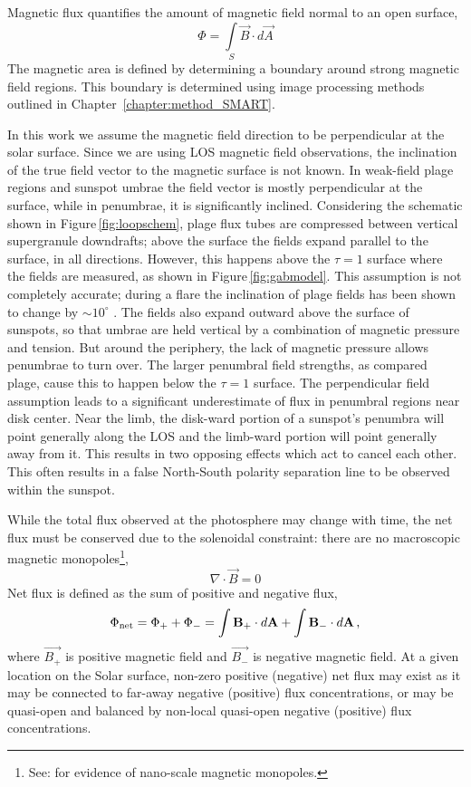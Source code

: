 Magnetic flux quantifies the amount of magnetic field normal to an open surface,
\begin{equation}
\Phi = \int\limits_S \vec{B} \cdot d\vec{A}  
\end{equation}
The magnetic area is defined by determining a boundary around strong magnetic field regions. This boundary is determined using image processing methods outlined in Chapter~\ref{chapter:method_SMART}.

In this work we assume the magnetic field direction to be perpendicular at the solar surface. Since we are using \gls{LOS} magnetic field observations, the inclination of the true field vector to the magnetic surface is not known. In weak-field plage regions and sunspot umbrae the field vector is mostly perpendicular at the surface, while in penumbrae, it is significantly inclined. Considering the schematic shown in Figure\,\ref{fig:loopschem}, plage flux tubes are compressed between vertical supergranule downdrafts; above the surface the fields expand parallel to the surface, in all directions. However, this happens above the $\tau=1$ surface where the fields are measured, as shown in Figure\,\ref{fig:gabmodel}. This assumption is not completely accurate; during a flare the inclination of plage fields has been shown to change by $\sim$$10^{\circ}$ \citep{Murray:2012}. The fields also expand outward above the surface of sunspots, so that umbrae are held vertical by a combination of magnetic pressure and tension. But around the periphery, the lack of magnetic pressure allows penumbrae to turn over. The larger penumbral field strengths, as compared plage, cause this to happen below the $\tau=1$ surface. The perpendicular field assumption leads to a significant underestimate of flux in penumbral regions near disk center. Near the limb,  the disk-ward portion of a sunspot's penumbra will point generally along the LOS and the limb-ward portion will point generally away from it. This results in two opposing effects which act to cancel each other. This often results in a false North-South polarity separation line to be observed within the sunspot.

While the total flux observed at the photosphere may change with time, the net flux must be conserved due to the solenoidal constraint: there are no macroscopic magnetic monopoles\footnote{See: \citet{Mengotti:2010} for evidence of nano-scale magnetic monopoles.},
\begin{equation}\label{eqn_gauss_law}
\nabla\cdot\vec{B}=0  
\end{equation}
Net flux is defined as the sum of positive and negative flux,
\begin{equation}
\Phi_{\mathrm{net}}=\Phi_{+}+\Phi_{-}=\int{\vec{B_{+}}\cdot d\vec{A}} + \int{\vec{B_{-}}\cdot d\vec{A}} \mbox{\,,}
\end{equation}
where $\vec{B_{+}}$ is positive magnetic field and $\vec{B_{-}}$ is negative magnetic field. At a given location on the Solar surface, non-zero positive (negative) net flux may exist as it may be connected to far-away negative (positive) flux concentrations, or may be quasi-open and balanced by non-local quasi-open negative (positive) flux concentrations.

